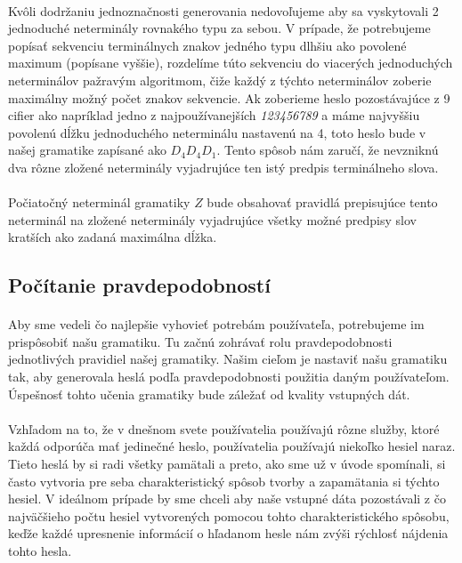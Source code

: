 \paragraph{}
Kvôli dodržaniu jednoznačnosti generovania nedovoľujeme aby sa vyskytovali 2 jednoduché neterminály rovnakého typu za sebou. V prípade, že potrebujeme popísať sekvenciu terminálnych znakov jedného typu dlhšiu ako povolené maximum (popísane vyššie), rozdelíme túto sekvenciu do viacerých jednoduchých neterminálov pažravým algoritmom, čiže každý z týchto neterminálov zoberie maximálny možný počet znakov sekvencie. Ak zoberieme heslo pozostávajúce z 9 cifier ako napríklad jedno z najpoužívanejších \emph{123456789} a máme najvyššiu povolenú dĺžku jednoduchého neterminálu nastavenú na 4, toto heslo bude v našej gramatike zapísané ako \(D_4D_4D_1\). Tento spôsob nám zaručí, že nevzniknú dva rôzne zložené neterminály vyjadrujúce ten istý predpis terminálneho slova.

\paragraph{}
Počiatočný neterminál gramatiky \(Z\) bude obsahovať pravidlá prepisujúce tento neterminál na zložené neterminály vyjadrujúce všetky možné predpisy slov kratších ako zadaná maximálna dĺžka.

\subsection{Počítanie pravdepodobností}
\paragraph{}
Aby sme vedeli čo najlepšie vyhovieť potrebám používateľa, potrebujeme im prispôsobiť našu gramatiku. Tu začnú zohrávať rolu pravdepodobnosti jednotlivých pravidiel našej gramatiky. Našim cieľom je nastaviť našu gramatiku tak, aby generovala heslá podľa pravdepodobnosti použitia daným používateľom. Úspešnosť tohto učenia gramatiky bude záležať od kvality vstupných dát.
\paragraph{}
Vzhľadom na to, že v dnešnom svete používatelia používajú rôzne služby, ktoré každá odporúča mať jedinečné heslo, používatelia používajú niekoľko hesiel naraz. Tieto heslá by si radi všetky pamätali a preto, ako sme už v úvode spomínali, si často vytvoria pre seba charakteristický spôsob tvorby a zapamätania si týchto hesiel. V ideálnom prípade by sme chceli aby naše vstupné dáta pozostávali z čo najväčšieho počtu hesiel vytvorených pomocou tohto charakteristického spôsobu, keďže každé upresnenie informácií o hľadanom hesle nám zvýši rýchlosť nájdenia tohto hesla.
